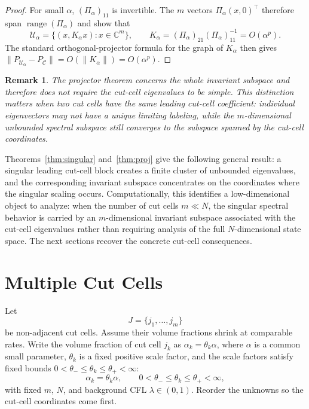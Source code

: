 \documentclass[preprint,12pt]{elsarticle}
\newtheorem{remark}[theorem]{Remark}
\begin{document}
\begin{proof}
For small $\alpha$, $(\Pi_\alpha)_{11}$ is invertible.  The $m$ vectors
$\Pi_\alpha(x,0)^\top$ therefore span $\operatorname{range}(\Pi_\alpha)$ and
show that
\[
    \mathcal U_\alpha
    =
    \{(x,K_\alpha x):x\in\mathbb C^m\},
    \qquad
    K_\alpha
    =
    (\Pi_\alpha)_{21}(\Pi_\alpha)_{11}^{-1}
    =
    O(\alpha^p).
\]
The standard orthogonal-projector formula for the graph of $K_\alpha$ then
gives
$\|P_{\mathcal U_\alpha}-P_{\mathcal C}\|=O(\|K_\alpha\|)=O(\alpha^p)$.
\end{proof}

\begin{remark}
The projector theorem concerns the whole invariant subspace and therefore does
not require the cut-cell eigenvalues to be simple.  This distinction matters
when two cut cells have the same leading cut-cell coefficient: individual
eigenvectors may not have a unique limiting labeling, while the $m$-dimensional unbounded spectral subspace still converges to the
subspace spanned by the cut-cell coordinates.
\end{remark}

Theorems~\ref{thm:singular} and~\ref{thm:proj} give the following general result:
a singular leading cut-cell block creates a finite cluster of unbounded eigenvalues, and
the corresponding invariant subspace concentrates on the coordinates where
the singular scaling occurs.  Computationally, this identifies a
low-dimensional object to analyze: when the number of cut cells
$m\ll N$, the singular spectral behavior is carried by an $m$-dimensional
invariant subspace associated with the cut-cell eigenvalues rather than requiring analysis of the full
$N$-dimensional state space.  The next sections recover the concrete
cut-cell consequences.

\section{Multiple Cut Cells}
\label{sec:multi}

Let
\[
    J=\{j_1,\ldots,j_m\}
\]
be non-adjacent cut cells.  Assume their volume fractions shrink at comparable rates.  Write the volume
fraction of cut cell $j_k$ as $\alpha_k=\theta_k\alpha$, where $\alpha$ is a
common small parameter, $\theta_k$ is a fixed positive scale factor, and the
scale factors satisfy fixed bounds $0<\theta_-\le\theta_k\le\theta_+<\infty$:
\begin{equation}
    \alpha_k=\theta_k\alpha,
    \qquad
    0<\theta_-\le\theta_k\le\theta_+<\infty,
    \label{eq:comparable-alpha}
\end{equation}
with fixed $m$, $N$, and background CFL $\lambda\in(0,1)$.  Reorder the
unknowns so the cut-cell coordinates come first.
\end{document}
